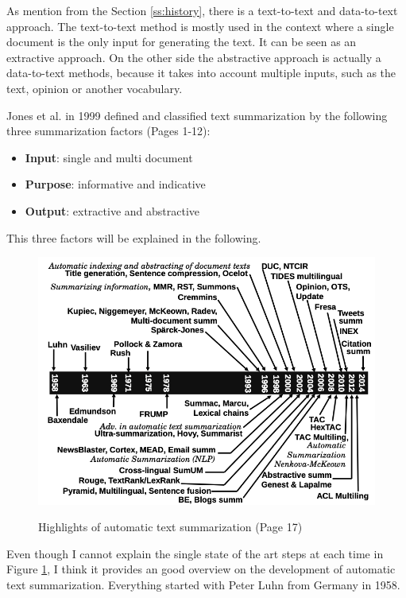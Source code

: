 As mention from the Section \ref{ss:history}, there is a text-to-text and data-to-text approach. The text-to-text method is mostly used in the context where a single document is the only input for generating the text. It can be seen as an extractive approach.  On the other side the abstractive approach is actually a data-to-text methods, because it takes into account multiple inputs, such as the text, opinion or another vocabulary.

Jones et al. in 1999 defined and classified text summarization by the following three summarization factors \cite{Jones98automaticsummarising:} (Pages 1-12):

\begin{itemize}
	\item \textbf{Input}: single and multi document
	\item \textbf{Purpose}: informative and indicative
	\item \textbf{Output}: extractive and abstractive
\end{itemize}

This three factors will be explained in the following.

\begin{figure}
	\begin{center}
		\includegraphics[width=5.5in]{photos/history}\\
		\caption{Highlights of automatic text summarization \cite{juan} (Page 17)}\label{hist}
	\end{center}
\end{figure}

Even though I cannot explain the single state of the art steps at each time in Figure \ref{hist}, I think it provides an good overview on the development of automatic text summarization. Everything started with Peter Luhn from Germany in 1958.

